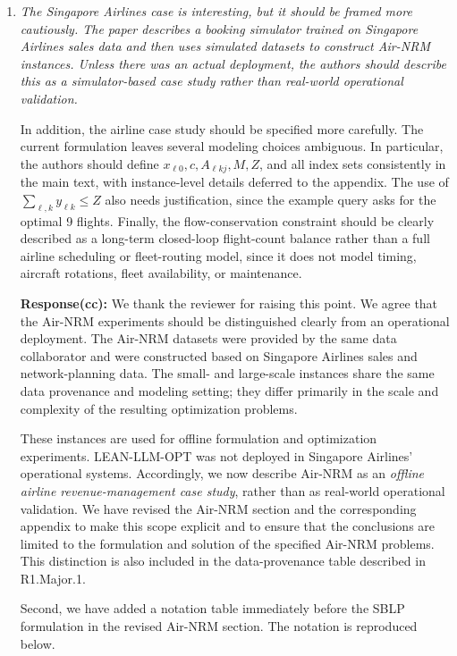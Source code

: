 \documentclass[11pt]{article}
\newcommand{\edit}[1]{{\color{hopkins-blue}\itshape #1}}
\begin{document}
\begin{enumerate}[label=(R1.Major.\arabic*),leftmargin=*]
\item \edit{The Singapore Airlines case is interesting, but it should be framed more cautiously. The paper describes a booking simulator trained on Singapore Airlines sales data and then uses simulated datasets to construct Air-NRM instances. Unless there was an actual deployment, the authors should describe this as a simulator-based case study rather than real-world operational validation.

In addition, the airline case study should be specified more carefully. The current formulation leaves several modeling choices ambiguous. In particular, the authors should define $x_{\ell 0}, c, A_{\ell k j}, M, Z$, and all index sets consistently in the main text, with instance-level details deferred to the appendix. The use of $\sum_{\ell,k} y_{\ell k} \leq Z$ also needs justification, since the example query asks for the optimal 9 flights. Finally, the flow-conservation constraint should be clearly described as a long-term closed-loop flight-count balance rather than a full airline scheduling or fleet-routing model, since it does not model timing, aircraft rotations, fleet availability, or maintenance.}\label{R1-major-6}

\noindent\textbf{Response(cc):} 
We thank the reviewer for raising this point. We agree that the Air-NRM
experiments should be distinguished clearly from an operational deployment.
The Air-NRM datasets were provided by the same data collaborator and were
constructed based on Singapore Airlines sales and network-planning data. The
small- and large-scale instances share the same data provenance and modeling
setting; they differ primarily in the scale and complexity of the resulting
optimization problems.

These instances are used for offline formulation and optimization experiments.
LEAN-LLM-OPT was not deployed in Singapore Airlines' operational systems.
Accordingly, we now describe Air-NRM as an \emph{offline airline
revenue-management case study}, rather than as real-world operational
validation. We have revised the Air-NRM section and the corresponding appendix
to make this scope explicit and to ensure that the conclusions are limited to
the formulation and solution of the specified Air-NRM problems. This
distinction is also included in the data-provenance table described in
R1.Major.1.

Second, we have added a notation table immediately before the SBLP formulation in the revised Air-NRM section. The notation is reproduced below.


\end{enumerate}
\end{document}
